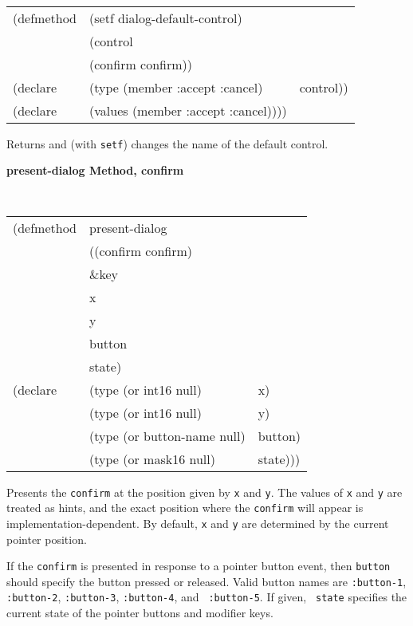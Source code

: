 {\samepage
\begin{flushright} \parbox[t]{6.125in}{
\tt
\begin{tabular}{lll}
\raggedright
(defmethod & (setf dialog-default-control) & \\
         & (control \\
         & (confirm confirm)) \\
(declare &(type (member :accept :cancel) & control))\\
(declare &(values (member :accept :cancel))))
\end{tabular}
\rm
}
\end{flushright}}



\begin{flushright} \parbox[t]{6.125in}{Returns and (with {\tt setf}) changes
the name of the default control. 
}\end{flushright}

{\samepage
{\large {\bf present-dialog \hfill Method, confirm}}
\begin{flushright} \parbox[t]{6.125in}{
\tt
\begin{tabular}{lll}
\raggedright
(defmethod & present-dialog & \\
           & ((confirm  confirm)\\
        & \&key \\
        & x \\
        & y\\
        & button\\
        & state)\\
(declare & (type (or int16 null)  & x)\\
         & (type (or int16 null)  & y)\\
        & (type (or button-name null) & button)\\ 
        & (type (or mask16 null)  & state)))\\ 
\end{tabular}
\rm

}\end{flushright}}



\begin{flushright} \parbox[t]{6.125in}{ Presents the {\tt confirm} at the
position given by {\tt x} and {\tt y}.  The values of {\tt x} and {\tt y} are
treated as hints, and the exact position where the {\tt confirm} will appear is
implementation-dependent.  By default, {\tt x} and {\tt y} are determined by the
current pointer position.
 
If the {\tt confirm} is presented in response to a pointer button event, then
{\tt button} should specify the button pressed or released. Valid button names
are {\tt :button-1}, {\tt :button-2}, {\tt :button-3}, {\tt :button-4}, and {\tt
:button-5}. If given, {\tt
state} specifies the current state of the pointer buttons and modifier keys.

}\end{flushright}


